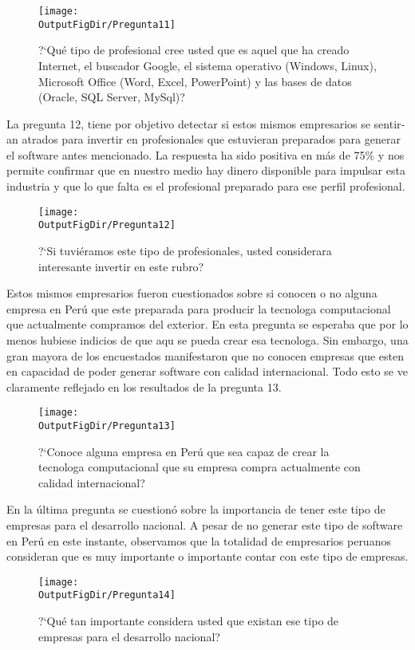 \begin{figure}[!h]
	\centering
	\texttt{[image: \\OutputFigDir/Pregunta11]}
	\label{fig:Preg11}
	\caption{?`Qué tipo de profesional cree usted que es aquel que ha creado Internet, el buscador Google, el sistema operativo (Windows, Linux), Microsoft Office (Word, Excel, PowerPoint) y las bases de datos (Oracle, SQL Server, MySql)?}
\end{figure}

La pregunta 12, tiene por objetivo detectar si estos mismos empresarios se sentir­an atra­dos para invertir en profesionales que estuvieran preparados para generar el software antes mencionado. La respuesta ha sido positiva en más de 75\% y nos permite confirmar que en nuestro medio hay dinero disponible para impulsar esta industria y que lo que falta es el profesional preparado para ese perfil profesional.

\begin{figure}[!h]
	\centering
	\texttt{[image: \\OutputFigDir/Pregunta12]}
	\label{fig:Preg12}
	\caption{?`Si tuviéramos este tipo de profesionales, usted considerar­a interesante invertir en este rubro?}
\end{figure}

Estos mismos empresarios fueron cuestionados sobre si conocen o no alguna empresa en Perú que este preparada para producir la tecnolog­a computacional que actualmente compramos del exterior. En esta pregunta se esperaba que por lo menos hubiese indicios de que aqu­ se pueda crear esa tecnolog­a. Sin embargo, una gran mayor­a de los encuestados manifestaron que no conocen empresas que esten en capacidad de poder generar software con calidad internacional. Todo esto se ve claramente reflejado en los resultados de la pregunta 13.

\begin{figure}[!h]
	\centering
	\texttt{[image: \\OutputFigDir/Pregunta13]}
	\label{fig:Preg13}
	\caption{?`Conoce alguna empresa en Perú que sea capaz de crear la tecnolog­a computacional que su empresa compra actualmente con calidad internacional?}
\end{figure}

En la última pregunta se cuestionó sobre la importancia de tener este tipo de empresas para el desarrollo nacional. A pesar de no generar este tipo de software en Perú en este instante, observamos que la totalidad de empresarios peruanos consideran que es muy importante o importante contar con este tipo de empresas.

\begin{figure}[!h]
	\centering
	\texttt{[image: \\OutputFigDir/Pregunta14]}
	\label{fig:Preg14}
	\caption{?`Qué tan importante considera usted que existan ese tipo de empresas para el desarrollo nacional?}
\end{figure}


